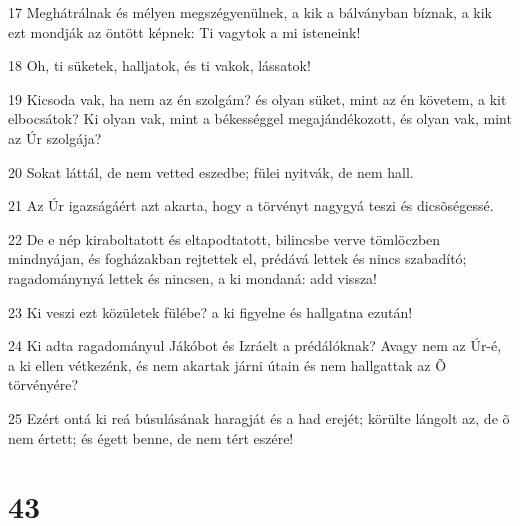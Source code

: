 \par 17 Meghátrálnak és mélyen megszégyenülnek, a kik a bálványban bíznak, a kik ezt mondják az öntött képnek: Ti vagytok a mi isteneink!
\par 18 Oh, ti süketek, halljatok, és ti vakok, lássatok!
\par 19 Kicsoda vak, ha nem az én szolgám? és olyan süket, mint az én követem, a kit elbocsátok? Ki olyan vak, mint a békességgel megajándékozott, és olyan vak, mint az Úr szolgája?
\par 20 Sokat láttál, de nem vetted eszedbe; fülei nyitvák, de nem hall.
\par 21 Az Úr igazságáért azt akarta, hogy a törvényt nagygyá teszi és dicsõségessé.
\par 22 De e nép kiraboltatott és eltapodtatott, bilincsbe verve tömlöczben mindnyájan, és fogházakban rejtettek el, prédává lettek és nincs szabadító; ragadománynyá lettek és nincsen, a ki mondaná: add vissza!
\par 23 Ki veszi ezt közületek fülébe? a ki figyelne és hallgatna ezután!
\par 24 Ki adta ragadományul Jákóbot és Izráelt a prédálóknak? Avagy nem az Úr-é, a ki ellen vétkezénk, és nem akartak járni útain és nem hallgattak az Õ törvényére?
\par 25 Ezért ontá ki reá búsulásának haragját és a had erejét; körülte lángolt az, de õ nem értett; és égett benne, de nem tért eszére!

\chapter{43}

